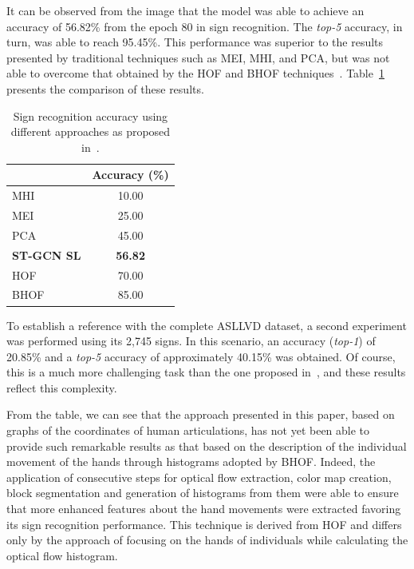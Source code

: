 It can be observed from the image that the model was able to achieve an accuracy of 56.82\% from the epoch 80 in sign recognition. The \textit{top-5} accuracy, in turn, was able to reach 95.45\%. This performance was superior to the results presented by traditional techniques such as MEI, MHI, and PCA, but was not able to overcome that obtained by the HOF and BHOF techniques~\cite{lim-2016}. Table~\ref{tab:results-comparison-20} presents the comparison of these results.

\begin{table}[ht]
\centering
\caption{Sign recognition accuracy using different approaches as proposed in~\cite{lim-2016}.}
\label{tab:results-comparison-20}
\begin{tabular}{lc}
\hline
                   & Accuracy (\%)  \\ \hline
MHI                & 10.00                     \\
MEI                & 25.00                     \\
PCA                & 45.00                     \\
\textbf{ST-GCN SL} & \textbf{56.82}            \\
HOF                & 70.00                     \\
BHOF               & 85.00                     \\ \hline
\end{tabular}
\end{table}

To establish a reference with the complete ASLLVD dataset, a second experiment was performed using its 2,745 signs. In this scenario, an accuracy (\textit{top-1}) of 20.85\% and a \textit{top-5} accuracy of approximately 40.15\% was obtained. Of course, this is a much more challenging task than the one proposed in~\cite{lim-2016}, and these results reflect this complexity.

From the table, we can see that the approach presented in this paper, based on graphs of the coordinates of human articulations, has not yet been able to provide such remarkable results as that based on the description of the individual movement of the hands through histograms adopted by BHOF. Indeed, the application of consecutive steps for optical flow extraction, color map creation, block segmentation and generation of histograms from them were able to ensure that more enhanced features about the hand movements were extracted favoring its sign recognition performance. This technique is derived from HOF and differs only by the approach of focusing on the hands of individuals while calculating the optical flow histogram.

